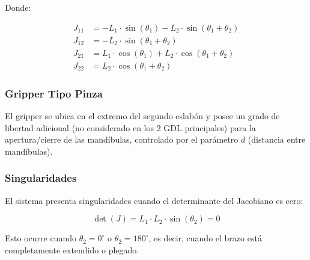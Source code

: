 Donde:

\begin{align}
    J_{11} &= -L_1 \cdot \sin(\theta_1) - L_2 \cdot \sin(\theta_1 + \theta_2) \\
    J_{12} &= -L_2 \cdot \sin(\theta_1 + \theta_2) \\
    J_{21} &= L_1 \cdot \cos(\theta_1) + L_2 \cdot \cos(\theta_1 + \theta_2) \\
    J_{22} &= L_2 \cdot \cos(\theta_1 + \theta_2)
\end{align}

\subsubsection{Gripper Tipo Pinza}

El gripper se ubica en el extremo del segundo eslabón y posee un grado de libertad adicional (no considerado en los 2 GDL principales) para la apertura/cierre de las mandíbulas, controlado por el parámetro $d$ (distancia entre mandíbulas).

\subsubsection{Singularidades}

El sistema presenta singularidades cuando el determinante del Jacobiano es cero:

\begin{equation}
    \det(J) = L_1 \cdot L_2 \cdot \sin(\theta_2) = 0
\end{equation}

Esto ocurre cuando \(\theta_2 = 0^\circ \) o \(\theta_2 = 180^\circ\), es decir, cuando el brazo está completamente extendido o plegado.

